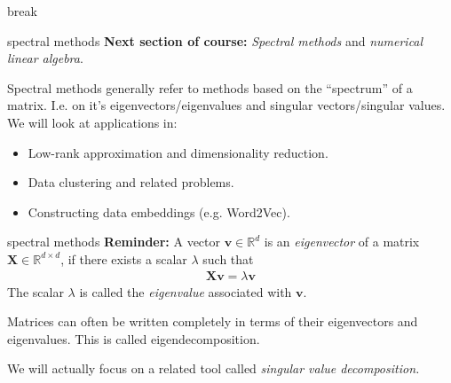 \documentclass[compress]{beamer}
\newcommand{\bv}[1]{\mathbf{#1}}
\newcommand{\R}{\mathbb{R}}
\begin{document}
\begin{frame}[standout]
	\begin{center}
			\large break
		\end{center}
\end{frame}

\begin{frame}{spectral methods}
	\textbf{Next section of course:} \emph{Spectral methods} and \emph{numerical linear algebra}.

	Spectral methods generally refer to methods based on the ``spectrum'' of a matrix. I.e. on it's eigenvectors/eigenvalues and singular vectors/singular values. We will look at applications in:
	\begin{itemize}
		\item Low-rank approximation and dimensionality reduction.
		\item Data clustering and related problems.
		\item Constructing data embeddings (e.g. Word2Vec).
	\end{itemize}
\end{frame}

\begin{frame}{spectral methods}
	\textbf{Reminder:} A vector $\bv{v}\in \R^{d}$ is an \emph{eigenvector} of a matrix $\bv{X}\in \R^{d\times d}$, if there exists a scalar $\lambda$ such that 
	\begin{align*}
		\bv{X}\bv{v} = \lambda \bv{v}
	\end{align*}
	The scalar $\lambda$ is called the \emph{eigenvalue} associated with $\bv{v}$.

	Matrices can often be written completely in terms of their eigenvectors and eigenvalues. This is called eigendecomposition. 

	We will actually focus on a related tool called \emph{singular value decomposition.}
\end{frame}




\end{document}
